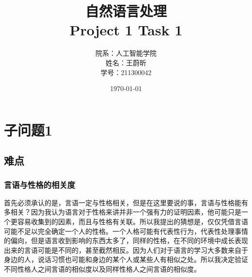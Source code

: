 \documentclass{article}
\title{\huge  自然语言处理\\ \large Project 1 Task 1}
\author{院系：人工智能学院\\姓名：王蔚昕\\学号：211300042}
\date{\today}
\begin{document}
	\maketitle
	\newpage
	\tableofcontents
	\newpage
	\section{子问题1}
	\subsection{难点}
	\subsubsection{言语与性格的相关度}
	首先必须承认的是，言语一定与性格相关，但是在这里要说的事，言语与性格能有多相关？因为我认为语言对于性格来讲并非一个强有力的证明因素，他可能只是一个更容易收集到的因素，而且与性格有关联。所以我提出的猜想是，仅仅凭借言语可能不足以完全确定一个人的性格。一个人格可能有代表性行为，代表性处理事情的偏向，但是语言收到影响的东西太多了，同样的性格，在不同的环境中成长表现出来的言语可能是不同的，甚至截然相反。因为人们对于语言的学习大多数来自于身边的人，说话习惯也可能和身边的某个人或某些人有相似之处。所以我决定验证不同性格人之间言语的相似度以及同样性格人之间言语的相似度。
	\subsubsection{}
	
\end{document}
